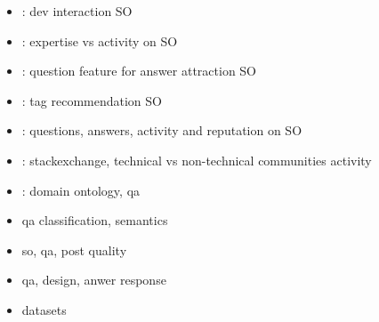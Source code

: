 \begin{itemize}
	\item \cite{Wang2013}: dev interaction SO
	\item \cite{Yang2014}: expertise vs activity on SO
	\item \cite{Cheng2013}: question feature for answer attraction SO
	\item \cite{Short2014}: tag recommendation SO
	\item \cite{Posnett2012}: questions, answers, activity and reputation on SO
	\item \cite{Ahmed2015}: stackexchange, technical vs non-technical communities activity
	\item \cite{Fu2008}: domain ontology, qa
	\item \cite{Li} qa classification, semantics
	\item \cite{Anderson2012} so, qa, post quality	
	\item \cite{Sinha2013} qa, design, anwer response	
	\item \cite{Klein2016,SpaceMachine.net2016,Wissner-Gross2016} datasets
\end{itemize}

